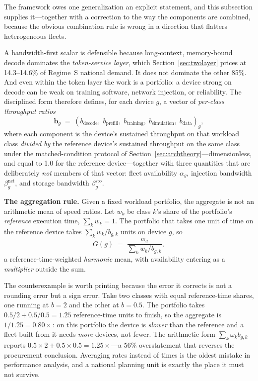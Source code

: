 The framework owes one generalization an explicit statement, and this subsection supplies it---together with a correction to the way the components are combined, because the obvious combination rule is wrong in a direction that flatters heterogeneous fleets.

A bandwidth-first scalar is defensible because long-context, memory-bound decode dominates the \emph{token-service layer}, which Section~\ref{sec:twolayer} prices at 14.3--14.6\% of Regime~S national demand. It does not dominate the other 85\%. And even within the token layer the work is a portfolio: a device strong on decode can be weak on training software, network injection, or reliability. The disciplined form therefore defines, for each device $g$, a vector of \emph{per-class throughput ratios}
\[
\mathbf{b}_g \;=\; \left( b_{\mathrm{decode}},\; b_{\mathrm{prefill}},\; b_{\mathrm{training}},\; b_{\mathrm{simulation}},\; b_{\mathrm{data}} \right)_g ,
\]
where each component is the device's sustained throughput on that workload class \emph{divided by} the reference device's sustained throughput on the same class under the matched-condition protocol of Section~\ref{sec:archtheory}---dimensionless, and equal to 1.0 for the reference device---together with three quantities that are deliberately \emph{not} members of that vector: fleet availability $\alpha_g$, injection bandwidth $\beta^{\mathrm{net}}_g$, and storage bandwidth $\beta^{\mathrm{sto}}_g$.

\textbf{The aggregation rule.} Given a fixed workload portfolio, the aggregate is not an arithmetic mean of speed ratios. Let $w_k$ be class $k$'s share of the portfolio's \emph{reference} execution time, $\sum_k w_k = 1$. The portfolio that takes one unit of time on the reference device takes $\sum_k w_k / b_{g,k}$ units on device $g$, so
\begin{equation}
G(g) \;=\; \frac{\alpha_g}{\sum_k w_k / b_{g,k}} ,
\label{eq:bgpu-agg}
\end{equation}
a reference-time-weighted \emph{harmonic} mean, with availability entering as a \emph{multiplier} outside the sum.

The counterexample is worth printing because the error it corrects is not a rounding error but a sign error. Take two classes with equal reference-time shares, one running at $b = 2$ and the other at $b = 0.5$. The portfolio takes $0.5/2 + 0.5/0.5 = 1.25$ reference-time units to finish, so the aggregate is $1/1.25 = \mathbf{0.80\times}$: on this portfolio the device is \emph{slower} than the reference and a fleet built from it needs \emph{more} devices, not fewer. The arithmetic form $\sum_k \omega_k b_{g,k}$ reports $0.5\times2 + 0.5\times0.5 = \mathbf{1.25\times}$---a 56\% overstatement that reverses the procurement conclusion. Averaging rates instead of times is the oldest mistake in performance analysis, and a national planning unit is exactly the place it must not survive.


